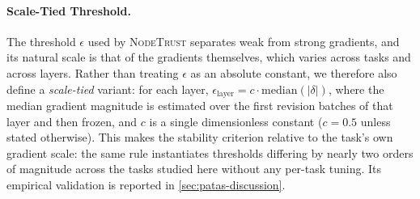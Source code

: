 \paragraph*{Scale-Tied Threshold.}
The threshold $\epsilon$ used by \textsc{NodeTrust} separates weak from strong gradients, and its natural scale is that of the gradients themselves, which varies across tasks and across layers. Rather than treating $\epsilon$ as an absolute constant, we therefore also define a \emph{scale-tied} variant: for each layer, $\epsilon_{\mathrm{layer}} = c \cdot \mathrm{median}(|\delta|)$, where the median gradient magnitude is estimated over the first revision batches of that layer and then frozen, and $c$ is a single dimensionless constant ($c = 0.5$ unless stated otherwise). This makes the stability criterion relative to the task's own gradient scale: the same rule instantiates thresholds differing by nearly two orders of magnitude across the tasks studied here without any per-task tuning. Its empirical validation is reported in \cref{sec:patas-discussion}.


